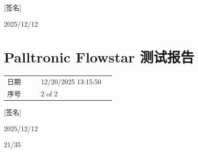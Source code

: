 \documentclass[UTF8,10pt,a4paper,fontset=fandol]{ctexart}
\newcommand{\fieldvalue}[1]{#1}
\newcommand{\handwritten}[1]{#1}
\begin{document}
\vspace{1em}

\fieldvalue{\handwritten{[签名]}}

\fieldvalue{\handwritten{2025/12/12}}

\section{Palltronic Flowstar 测试报告}

\begin{tabular}{@{}p{0.28\linewidth}p{0.62\linewidth}@{}}
日期 &
\fieldvalue{12/20/2025 13:15:50}
\\
序号 &
\fieldvalue{2 of 2}
\end{tabular}

\vspace{1em}

\begin{center}
\setlength{\fboxsep}{8pt}
\end{center}

\fieldvalue{\handwritten{[签名]}}

\fieldvalue{\handwritten{2025/12/12}}

\handwritten{21/35}
\end{document}
